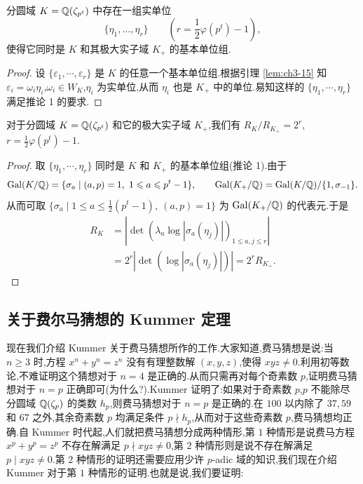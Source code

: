 \begin{corollary}
分圆域 $K=\mathbb{Q}(\zeta_{p^t})$ 中存在一组实单位
\[
  \{\eta_1,\dots,\eta_r\}\qquad\left(r=\frac{1}{2}\varphi(p^t)-1\right),
\]
使得它同时是 $K$ 和其极大实子域 $K_+$ 的基本单位组.
\end{corollary}

\begin{proof}
设 $\{\varepsilon_1,\cdots,\varepsilon_r\}$ 是 $K$ 的任意一个基本单位组.根据引理 \ref{lem:ch3-15} 知 $\varepsilon_i=\omega_i\eta_i$,$\omega_i\in W_K$,$\eta_i$ 为实单位,从而 $\eta_i$ 也是 $K_+$ 中的单位.易知这样的 $\{\eta_1,\cdots,\eta_r\}$ 满足推论 1 的要求.
\end{proof}

\begin{corollary}
对于分圆域 $K=\mathbb{Q}(\zeta_{p^t})$ 和它的极大实子域 $K_+$,我们有 $R_K/R_{K_+}=2^r$,$r=\frac{1}{2}\varphi(p^t)-1$.
\end{corollary}

\begin{proof}
取 $\{\eta_1,\cdots,\eta_r\}$ 同时是 $K$ 和 $K_+$ 的基本单位组(推论 1).由于
\[
  \operatorname{Gal}(K/\mathbb{Q})=\{\sigma_a\mid(a,p)=1,\ 1\leqslant a\leqslant p^t-1\},\qquad
  \operatorname{Gal}(K_+/\mathbb{Q})=\operatorname{Gal}(K/\mathbb{Q})/\{1,\sigma_{-1}\}.
\]
从而可取 $\{\sigma_a\mid 1\leqslant a\leqslant\frac{1}{2}(p^t-1),\ (a,p)=1\}$ 为 $\operatorname{Gal}(K_+/\mathbb{Q})$ 的代表元.于是
\begin{align*}
  R_K&=\left|\det\left(\lambda_a\log|\sigma_a(\eta_j)|\right)_{1\leqslant a,j\leqslant r}\right|\\
  &=2^r\left|\det\left(\log|\sigma_a(\eta_j)|\right)\right|=2^rR_{K_+}.
\end{align*}
\end{proof}

\subsection{关于费尔马猜想的 Kummer 定理}\label{sec:ch3-s2-4}

\begin{sloppypar}
现在我们介绍 Kummer 关于费马猜想所作的工作.大家知道,费马猜想是说:当 $n\geqslant 3$ 时,方程 $x^n+y^n=z^n$ 没有有理整数解 $(x,y,z)$,使得 $xyz\neq 0$.利用初等数论,不难证明这个猜想对于 $n=4$ 是正确的.从而只需再对每个奇素数 $p$,证明费马猜想对于 $n=p$ 正确即可(为什么?).Kummer 证明了:如果对于奇素数 $p$,$p$ 不能除尽分圆域 $\mathbb{Q}(\zeta_p)$ 的类数 $h_p$,则费马猜想对于 $n=p$ 是正确的.在 $100$ 以内除了 $37,59$ 和 $67$ 之外,其余奇素数 $p$ 均满足条件 $p\nmid h_p$,从而对于这些奇素数 $p$,费马猜想均正确.自 Kummer 时代起,人们就把费马猜想分成两种情形,第 $1$ 种情形是说费马方程 $x^p+y^p=z^p$ 不存在解满足 $p\nmid xyz\neq 0$,第 $2$ 种情形则是说不存在解满足 $p\mid xyz\neq 0$.第 $2$ 种情形的证明还需要应用少许 $p$-adic 域的知识,我们现在介绍 Kummer 对于第 $1$ 种情形的证明.也就是说,我们要证明:
\end{sloppypar}

